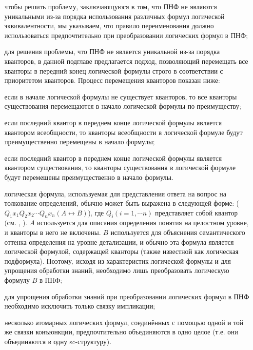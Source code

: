 \begin{textitemize}
	\item чтобы решить проблему, заключающуюся в том, что ПНФ не являются уникальными из-за порядка использования различных формул логической эквивалентности, мы указываем, что правило переименования должно использоваться предпочтительно при преобразовании логических формул в ПНФ;
	
	\item для решения проблемы, что ПНФ не является уникальной из-за порядка кванторов, в данной подглаве предлагается подход, позволяющий перемещать все кванторы в передний конец логической формулы строго в соответствии с приоритетом кванторов. Процесс перемещения кванторов показан ниже:
	
	\begin{textitemize}
		\item если в начале логической формулы не существует кванторов, то все кванторы существования перемещаются в начало логической формулы по преимуществу;
		
		\item если последний квантор в переднем конце логической формулы является квантором всеобщности, то кванторы всеобщности в логической формуле будут преимущественно перемещены в начало формулы;
		
		\item если последний квантор в переднем конце логической формулы является квантором существования, то кванторы существования в логической формуле будут перемещены преимущественно в начало формулы.
	\end{textitemize}
	
	\item логическая формула, используемая для представления ответа на вопрос на толкование определений, обычно может быть выражена в следующей форме: ($Q_{1}x_{1}Q_{2}x_{2}\cdots Q_{n}x_{n}(A\leftrightarrow B)$), где $Q_{i}\left ( i = 1, \cdots n \right )$ представляет собой квантор (см. , ). $A$ используется для описания определения понятия на целостном уровне, и кванторы в него не включены. $B$ используется для объяснения семантического оттенка определения на уровне детализации, и обычно эта формула является логической формулой, содержащей кванторы (также известной как логическая подформула). Поэтому, исходя из характеристик логической формулы и для упрощения обработки знаний, необходимо лишь преобразовать логическую формулу $B$ в ПНФ;
	
	\item для упрощения обработки знаний при преобразовании логических формул в ПНФ необходимо исключить только связку импликации;
	
	\item несколько атомарных логических формул, соединённых с помощью одной и той же связки конъюнкции, предпочтительно объединяются в одно целое (т.е. они объединяются в одну sc-структуру).
	
\end{textitemize}

